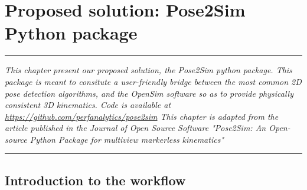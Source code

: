 
\lhead[\fancyplain{}{\leftmark}]%
      {\fancyplain{}{}} %
\chead[\fancyplain{}{}]%
      {\fancyplain{}{}}
\rhead[\fancyplain{}{}]%
      {\fancyplain{}{\rightmark}}%
\lfoot[\fancyplain{}{}]%
      {\fancyplain{}{}}
\cfoot[\fancyplain{}{\thepage}]%
      {\fancyplain{}{\thepage}} %
\rfoot[\fancyplain{}{}]%
     {\fancyplain{}{\scriptsize}}



\chapter{Proposed solution: Pose2Sim Python package}
\label{ch:3}


\begin{center}
\rule{0.7\linewidth}{.5pt}
\begin{minipage}{0.7\linewidth}
\smallskip

\textit{This chapter present our proposed solution, the Pose2Sim python package. This package is meant to consitute a user-friendly bridge between the most common 2D pose detection algorithms, and the OpenSim software so as to provide physically consistent 3D kinematics. Code is available at \url{https://github.com/perfanalytics/pose2sim} \newline \newline
This chapter is adapted from the article published in the Journal of Open Source Software "Pose2Sim: An Open-source Python Package for multiview markerless kinematics" \cite{Pagnon2022b}}

\end{minipage}
\smallskip
\rule{0.7\linewidth}{.5pt}
\end{center}

\minitoc
\newpage


\section{Introduction to the workflow}

